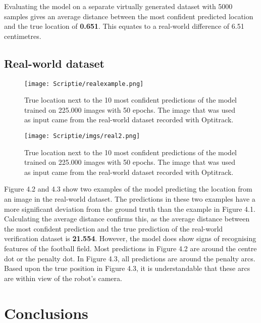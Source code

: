 \documentclass{uva-inf-bachelor-thesis}
\begin{document}
    Evaluating the model on a separate virtually generated dataset with 5000 samples gives an average distance between the most confident predicted location and the true location of \textbf{0.651}. This equates to a real-world difference of 6.51 centimetres. 

    \section{Real-world dataset}
        \begin{figure}[H]
        \centering
        \texttt{[image: Scriptie/realexample.png]}
        \caption{True location next to the 10 most confident predictions of the model trained on 225.000 images with 50 epochs. The image that was used as input came from the real-world dataset recorded with Optitrack.}
        \end{figure}

        \begin{figure}[H]
        \centering
        \texttt{[image: Scriptie/imgs/real2.png]}
        \caption{True location next to the 10 most confident predictions of the model trained on 225.000 images with 50 epochs. The image that was used as input came from the real-world dataset recorded with Optitrack.}
        \end{figure}

        Figure 4.2 and 4.3 show two examples of the model predicting the location from an image in the real-world dataset. The predictions in these two examples have a more significant deviation from the ground truth than the example in Figure 4.1. Calculating the average distance confirms this, as the average distance between the most confident prediction and the true prediction of the real-world verification dataset is \textbf{21.554}. However, the model does show signs of recognising features of the football field. Most predictions in Figure 4.2 are around the centre dot or the penalty dot. In Figure 4.3, all predictions are around the penalty arcs. Based upon the true position in Figure 4.3, it is understandable that these arcs are within view of the robot's camera. 

\chapter{Conclusions}
    
\end{document}
